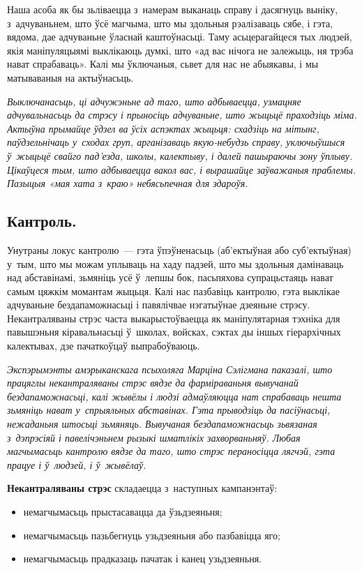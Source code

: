 Наша асоба як бы зьліваецца з~намерам выканаць справу і дасягнуць выніку, з~адчуваньнем, што ўсё магчыма, што мы здольныя рэалізаваць сябе, і гэта, вядома, дае адчуваньне ўласнай каштоўнасьці. Таму асьцерагайцеся тых людзей, якія маніпуляцыямі выклікаюць думкі, што «ад вас нічога не залежыць, ня трэба нават спрабаваць». Калі мы ўключаныя, сьвет для нас не абыякавы, і мы матываваныя на актыўнасьць.

\emph{Выключанасьць, ці адчужэньне ад таго, што адбываецца, узмацняе адчувальнасьць да стрэсу і прыносіць адчуваньне, што жыцьцё праходзіць міма. Актыўна прымайце ўдзел ва ўсіх аспэктах жыцьця: схадзіць на мітынг, паўдзельнічаць у~сходах груп, арганізаваць якую-небудзь справу, уключыўшыся ў~жыцьцё свайго пад'езда, школы, калектыву, і далей пашыраючы зону ўплыву. Цікаўцеся тым, што адбываецца вакол вас, і вырашайце заўважаныя праблемы. Пазыцыя «мая хата з~краю» небясьпечная для здароўя.}

\subsection*{Кантроль.} 

Унутраны локус кантролю~--- гэта ўпэўненасьць (аб'ектыўная або суб'ектыўная) у~тым, што мы можам уплываць на хаду падзей, што мы здольныя дамінаваць над абставінамі, зьмяніць усё ў~лепшы бок, пасьпяхова супрацьстаяць нават самым цяжкім момантам жыцьця. Калі нас пазбавіць кантролю, гэта выклікае адчуваньне бездапаможнасьці і павялічвае нэгатыўнае дзеяньне стрэсу. Некантраляваны стрэс часта выкарыстоўваецца як маніпулятарная тэхніка для павышэньня кіравальнасьці ў~школах, войсках, сэктах ды іншых гіерархічных калектывах, дзе пачаткоўцаў выпрабоўваюць.

\emph{Экспэрымэнты амэрыканскага псыхоляга Марціна Сэлігмана паказалі, што працяглы некантраляваны стрэс вядзе да фарміраваньня вывучанай бездапаможнасьці, калі жывёлы і людзі адмаўляюцца нат спрабаваць нешта зьмяніць нават у~спрыяльных абставінах. Гэта прыводзіць да пасіўнасьці, нежаданьня штосьці зьмяняць. Вывучаная бездапаможнасьць зьвязаная з~дэпрэсіяй і павелічэньнем рызыкі шматлікіх захворваньняў. Любая магчымасьць кантролю вядзе да таго, што стрэс пераносіцца лягчэй, гэта працуе і ў~людзей, і ў~жывёлаў.}

\textbf{Некантраляваны стрэс} складаецца з~наступных кампанэнтаў: 
\begin{itemize}
  \item немагчымасьць прыстасавацца да ўзьдзеяньня;
  \item немагчымасьць пазьбегнуць узьдзеяньня або пазбавіцца яго;
  \item немагчымасьць прадказаць пачатак і канец узьдзеяньня.
\end{itemize}

